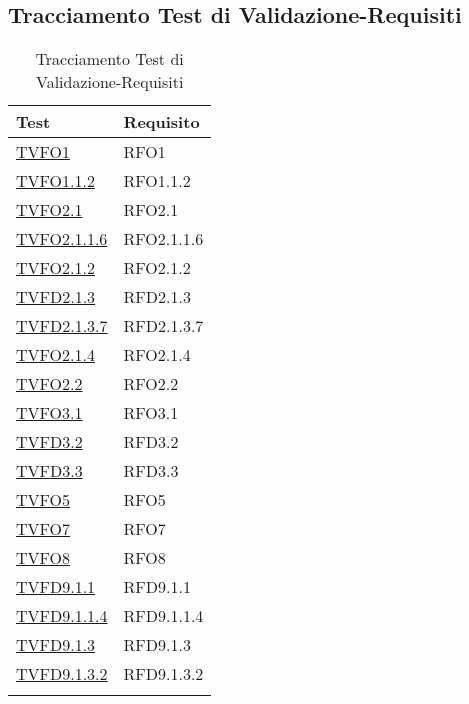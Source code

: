 \subsection{Tracciamento Test di Validazione-Requisiti}
\normalsize
\begin{longtable}{|>{\centering}m{5cm}|m{5cm}<{\centering}|}
\hline 
\textbf{Test} & \textbf{Requisito}\\
\hline
\endhead
\hyperlink{TVFO1}{TVFO1} & RFO1\\ \hline
\hyperlink{TVFO1.1.2}{TVFO1.1.2} & RFO1.1.2\\ \hline
\hyperlink{TVFO2.1}{TVFO2.1} & RFO2.1\\ \hline
\hyperlink{TVFO2.1.1.6}{TVFO2.1.1.6} & RFO2.1.1.6\\ \hline
\hyperlink{TVFO2.1.2}{TVFO2.1.2} & RFO2.1.2\\ \hline
\hyperlink{TVFD2.1.3}{TVFD2.1.3} & RFD2.1.3\\ \hline
\hyperlink{TVFD2.1.3.7}{TVFD2.1.3.7} & RFD2.1.3.7\\ \hline
\hyperlink{TVFO2.1.4}{TVFO2.1.4} & RFO2.1.4\\ \hline
\hyperlink{TVFO2.2}{TVFO2.2} & RFO2.2\\ \hline
\hyperlink{TVFO3.1}{TVFO3.1} & RFO3.1\\ \hline
\hyperlink{TVFD3.2}{TVFD3.2} & RFD3.2\\ \hline
\hyperlink{TVFD3.3}{TVFD3.3} & RFD3.3\\ \hline
\hyperlink{TVFO5}{TVFO5} & RFO5\\ \hline
\hyperlink{TVFO7}{TVFO7} & RFO7\\ \hline
\hyperlink{TVFO8}{TVFO8} & RFO8\\ \hline
\hyperlink{TVFD9.1.1}{TVFD9.1.1} & RFD9.1.1\\ \hline
\hyperlink{TVFD9.1.1.4}{TVFD9.1.1.4} & RFD9.1.1.4\\ \hline
\hyperlink{TVFD9.1.3}{TVFD9.1.3} & RFD9.1.3\\ \hline
\hyperlink{TVFD9.1.3.2}{TVFD9.1.3.2} & RFD9.1.3.2\\ \hline
\caption[Tracciamento Test di Validazione-Requisiti]{Tracciamento Test di Validazione-Requisiti}
\label{tabella:tv-requi}
\end{longtable}
\clearpage
